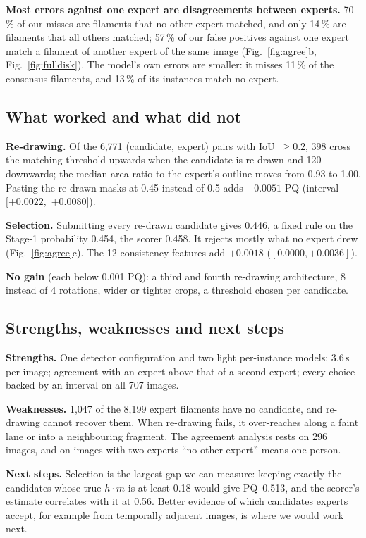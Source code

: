\documentclass[sigconf]{acmart}
\begin{document}
        \textbf{Most errors against one expert are disagreements between experts.}
        70\,\% of our misses are filaments that no other expert matched, and only 14\,\% are filaments that all others matched; 57\,\% of our false positives against one expert match a filament of another expert of the same image (Fig.~\ref{fig:agree}b, Fig.~\ref{fig:fulldisk}).
        The model's own errors are smaller: it misses 11\,\% of the consensus filaments, and 13\,\% of its instances match no expert.

    \subsection{What worked and what did not}\label{sec:stages}
        \textbf{Re-drawing.} Of the 6{,}771 (candidate, expert) pairs with IoU~$\ge0.2$, 398 cross the matching threshold upwards when the candidate is re-drawn and 120 downwards; the median area ratio to the expert's outline moves from 0.93 to 1.00. Pasting the re-drawn masks at 0.45 instead of 0.5 adds $+0.0051$ PQ (interval $[+0.0022,$ $+0.0080]$).

        \textbf{Selection.} Submitting every re-drawn candidate gives 0.446, a fixed rule on the Stage-1 probability 0.454, the scorer 0.458. It rejects mostly what no expert drew (Fig.~\ref{fig:agree}c). The 12 consistency features add $+0.0018$ ($[0.0000, +0.0036]$).

        \textbf{No gain} (each below 0.001 PQ): a third and fourth re-drawing architecture, 8 instead of 4 rotations, wider or tighter crops, a threshold chosen per candidate.

    \subsection{Strengths, weaknesses and next steps}\label{sec:limits}
        \textbf{Strengths.} One detector configuration and two light per-instance models; 3.6\,s per image; agreement with an expert above that of a second expert; every choice backed by an interval on all 707 images.

        \textbf{Weaknesses.} 1{,}047 of the 8{,}199 expert filaments have no candidate, and re-drawing cannot recover them. When re-drawing fails, it over-reaches along a faint lane or into a neighbouring fragment. The agreement analysis rests on 296 images, and on images with two experts ``no other expert'' means one person.

        \textbf{Next steps.} Selection is the largest gap we can measure: keeping exactly the candidates whose true $h\cdot m$ is at least 0.18 would give PQ~0.513, and the scorer's estimate correlates with it at 0.56. Better evidence of which candidates experts accept, for example from temporally adjacent images, is where we would work next.
\end{document}
